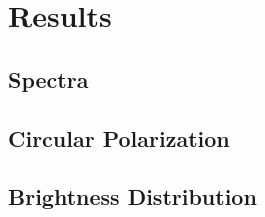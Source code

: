\section{Results}

\subsection{Spectra}


\subsection{Circular Polarization}


\subsection{Brightness Distribution}
